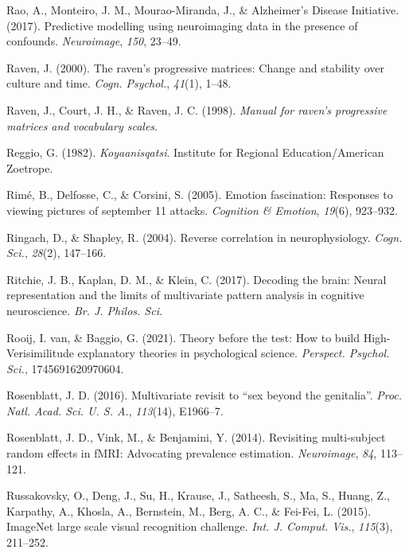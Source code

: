 \documentclass[12pt,american,a4paper,oneside,]{memoir} %
\begin{document}
\leavevmode\hypertarget{ref-Rao2017-bw}{}%
Rao, A., Monteiro, J. M., Mourao-Miranda, J., \& Alzheimer's Disease Initiative. (2017). Predictive modelling using neuroimaging data in the presence of confounds. \emph{Neuroimage}, \emph{150}, 23--49.

\leavevmode\hypertarget{ref-Raven2000-hs}{}%
Raven, J. (2000). The raven's progressive matrices: Change and stability over culture and time. \emph{Cogn. Psychol.}, \emph{41}(1), 1--48.

\leavevmode\hypertarget{ref-Raven1998-om}{}%
Raven, J., Court, J. H., \& Raven, J. C. (1998). \emph{Manual for raven's progressive matrices and vocabulary scales}.

\leavevmode\hypertarget{ref-Reggio1982-ex}{}%
Reggio, G. (1982). \emph{Koyaanisqatsi}. Institute for Regional Education/American Zoetrope.

\leavevmode\hypertarget{ref-rime2005brief}{}%
Rimé, B., Delfosse, C., \& Corsini, S. (2005). Emotion fascination: Responses to viewing pictures of september 11 attacks. \emph{Cognition \& Emotion}, \emph{19}(6), 923--932.

\leavevmode\hypertarget{ref-Ringach2004-nn}{}%
Ringach, D., \& Shapley, R. (2004). Reverse correlation in neurophysiology. \emph{Cogn. Sci.}, \emph{28}(2), 147--166.

\leavevmode\hypertarget{ref-Ritchie2017-gl}{}%
Ritchie, J. B., Kaplan, D. M., \& Klein, C. (2017). Decoding the brain: Neural representation and the limits of multivariate pattern analysis in cognitive neuroscience. \emph{Br. J. Philos. Sci.}

\leavevmode\hypertarget{ref-Van_Rooij2021-bk}{}%
Rooij, I. van, \& Baggio, G. (2021). Theory before the test: How to build High-Verisimilitude explanatory theories in psychological science. \emph{Perspect. Psychol. Sci.}, 1745691620970604.

\leavevmode\hypertarget{ref-Rosenblatt2016-oy}{}%
Rosenblatt, J. D. (2016). Multivariate revisit to ``sex beyond the genitalia''. \emph{Proc. Natl. Acad. Sci. U. S. A.}, \emph{113}(14), E1966--7.

\leavevmode\hypertarget{ref-Rosenblatt2014-az}{}%
Rosenblatt, J. D., Vink, M., \& Benjamini, Y. (2014). Revisiting multi-subject random effects in fMRI: Advocating prevalence estimation. \emph{Neuroimage}, \emph{84}, 113--121.

\leavevmode\hypertarget{ref-Russakovsky2015-oo}{}%
Russakovsky, O., Deng, J., Su, H., Krause, J., Satheesh, S., Ma, S., Huang, Z., Karpathy, A., Khosla, A., Bernstein, M., Berg, A. C., \& Fei-Fei, L. (2015). ImageNet large scale visual recognition challenge. \emph{Int. J. Comput. Vis.}, \emph{115}(3), 211--252.
\end{document}
